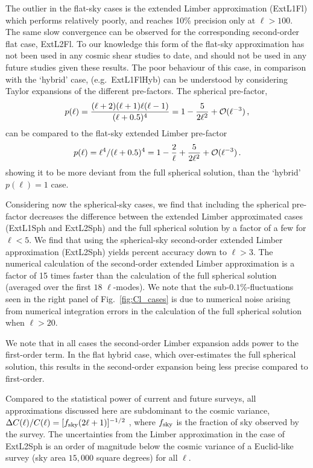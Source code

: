 \documentclass[fleqn,usenatbib]{mnras} %
\begin{document}
The outlier in the flat-sky cases is the extended Limber approximation
(ExtL1Fl) which performs relatively poorly, and reaches 10\% precision only at
$\ell > 100$. The same slow convergence can be observed for the corresponding
second-order flat case, ExtL2Fl. To our knowledge this form of the flat-sky
approximation has not been used in any cosmic shear studies to date, and should
not be used in any future studies given these results.  The poor behaviour of
this case, in comparison with the `hybrid' case, (e.g.~ExtL1FlHyb) can be
understood by considering Taylor expansions of the different pre-factors.  The
spherical pre-factor,
%
\begin{equation}
p(\ell) = \frac{(\ell+2)(\ell+1)\ell(\ell-1)}{(\ell + 0.5)^4} = 1-{5\over 2\ell^2} +{\cal O}(\ell^{-3}) \, ,
\end{equation}
%
can be compared to the flat-sky extended Limber pre-factor
%
\begin{equation}
p(\ell) = \ell^4 / (\ell + 0.5)^4 = 1-{2\over \ell}+{5\over 2\ell^2} +{\cal O}(\ell^{-3}) \, . 
\end{equation} 
%
showing it to be more deviant from the full spherical solution, than the
`hybrid' $p(\ell) = 1$ case. 

Considering now the spherical-sky cases, we find that including the spherical
pre-factor decreases the difference between the extended Limber approximated
cases (ExtL1Sph and ExtL2Sph) and the full spherical solution by a factor of a
few for $\ell < 5$.   We find that using the spherical-sky second-order
extended Limber approximation (ExtL2Sph) yields percent accuracy down to $\ell
> 3$.  The numerical calculation of the second-order extended Limber
approximation is a factor of 15 times faster than the calculation of the
full spherical solution (averaged over the first $18$ $\ell$-modes). We
note that the sub-$0.1\%$-fluctuations seen in the right panel of
Fig.~\ref{fig:Cl_cases} is due to numerical noise arising from numerical
integration errors in the calculation of the full spherical solution when $\ell
> 20$.

We note that in all cases the second-order Limber expansion adds power
to the first-order term. In the flat hybrid case, which over-estimates the full
spherical solution, this results in the second-order expansion being less
precise compared to first-order.

Compared to the statistical power of current and future surveys, all
approximations discussed here are subdominant to the cosmic variance, $\Delta
C(\ell) / C(\ell) = [f_{\rm sky} (2 \ell + 1)]^{-1/2}$
\citep{1992ApJ...388..272K}, where $f_{\rm sky}$ is the fraction of sky observed
by the survey. The uncertainties from the Limber approximation in the case of
ExtL2Sph is an order of magnitude below the cosmic variance of a Euclid-like
survey (sky area $15,000$ square degrees) for all $\ell$.
\end{document}
